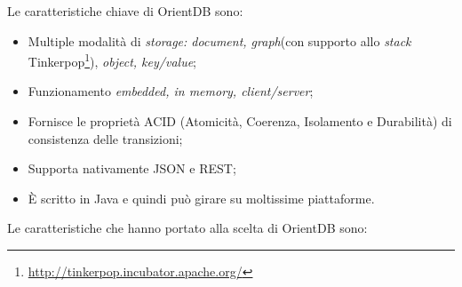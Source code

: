 Le caratteristiche chiave di OrientDB sono:
\begin{itemize}
	\item Multiple modalità di \textit{storage: document, graph}(con supporto allo \textit{stack} Tinkerpop\footnote{\url{http://tinkerpop.incubator.apache.org/}}), \textit{object, key/value};
	\item Funzionamento \textit{embedded, in memory, client/server};
	\item Fornisce le proprietà ACID (Atomicità, Coerenza, Isolamento e Durabilità) di consistenza delle transizioni;
	\item Supporta nativamente \gls{JSON} e \gls{REST};
	\item È scritto in Java e quindi può girare su moltissime piattaforme.
\end{itemize}
Le caratteristiche che hanno portato alla scelta di OrientDB sono:
